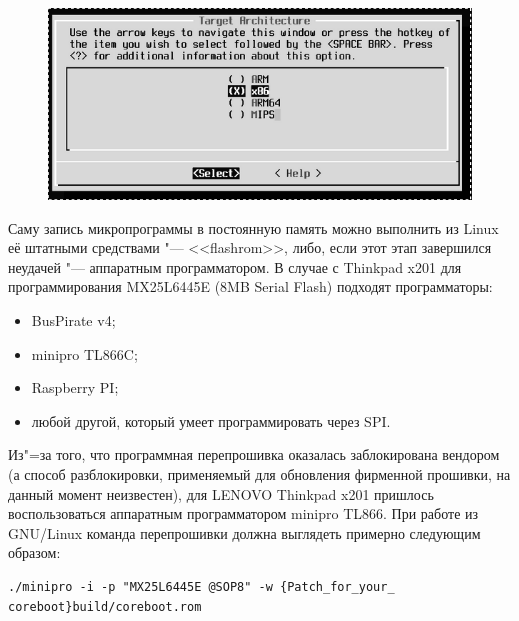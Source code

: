 \documentclass[10pt, a5paper]{article}
\begin{document}
\begin{figure}[h!]
  \centering
  \includegraphics[scale=0.4]{10_2015_fig2}
\end{figure}

Саму запись микропрограммы в постоянную память можно выполнить из Linux её штатными средствами "--- <<flashrom>>, либо, если этот этап завершился неудачей "--- аппаратным программатором.  В случае с Thinkpad x201 для программирования MX25L6445E (8MB Serial Flash) подходят программаторы:

\begin{itemize}
  \item BusPirate v4;
  \item minipro TL866C;
  \item Raspberry PI;
  \item любой другой, который умеет программировать через SPI.
\end{itemize}

Из"=за того, что программная перепрошивка оказалась заблокирована вендором (а способ разблокировки, применяемый для обновления фирменной прошивки, на данный момент неизвестен), для LENOVO Thinkpad x201 пришлось воспользоваться аппаратным программатором minipro TL866. При работе из GNU/Linux команда перепрошивки должна выглядеть примерно следующим образом:

\begin{verbatim}./minipro -i -p "MX25L6445E @SOP8" -w {Patch_for_your_
coreboot}build/coreboot.rom\end{verbatim}
\end{document}
